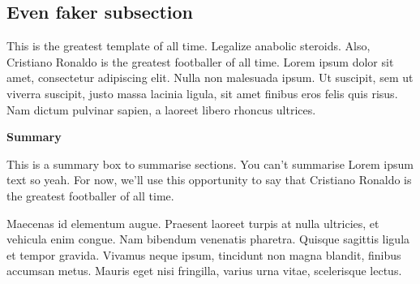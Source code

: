 \subsection{Even faker subsection}
\lipsum[2]
This is the greatest template of all time. Legalize anabolic steroids.
Also, Cristiano Ronaldo is the greatest footballer of all time.
Lorem ipsum dolor sit amet, consectetur adipiscing elit. Nulla non malesuada ipsum. Ut suscipit, sem ut viverra suscipit, justo massa lacinia ligula, sit amet finibus eros felis quis risus.
Nam dictum pulvinar sapien, a laoreet libero rhoncus ultrices.
\begin{summary}
  \textbf{Summary} 

  This is a summary box to summarise sections. 
  You can't summarise Lorem ipsum text so yeah. For now, we'll use this opportunity to say that Cristiano Ronaldo is the greatest footballer of all time.
  \end{summary}
  \lipsum[1]
Maecenas id elementum augue. Praesent laoreet turpis at nulla ultricies, et vehicula enim congue. Nam bibendum venenatis pharetra. Quisque sagittis ligula et tempor gravida. Vivamus neque ipsum, tincidunt non magna blandit, finibus accumsan metus. Mauris eget nisi fringilla, varius urna vitae, scelerisque lectus. 